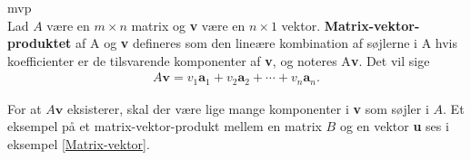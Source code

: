 \begin{defn}{}{mvp}
\phantom{gdfs}\\Lad $A$ være en $m \times n$ matrix og \textbf{v} være en $n \times 1$ vektor. \textbf{Matrix-vektor-produktet} af A og \textbf{v} defineres som den lineære kombination af søjlerne i A hvis koefficienter er de tilsvarende komponenter af \textbf{v}, og noteres A\textbf{v}. Det vil sige
\begin{align*}
A\textbf{v} =v_1\textbf{a}_1 + v_2\textbf{a}_2 + \cdots + v_n\textbf{a}_n.
\end{align*}
\end{defn}
\noindent
For at $A\textbf{v}$ eksisterer, skal der være lige mange komponenter i \textbf{v} som søjler i $A$. Et eksempel på et matrix-vektor-produkt mellem en matrix $B$ og en vektor \textbf{u} ses i eksempel \ref{Matrix-vektor}.
